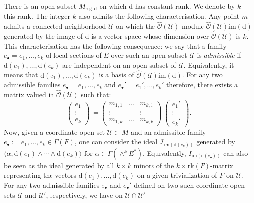 \documentclass[10pt]{article}
\theoremstyle{plain}
\theoremstyle{definition}
\theoremstyle{remark}
\newcommand{\dd}{\mathrm{d}}
\begin{document}
There is an open subset $ M_{\mathrm{reg},\dd}$ on which $\dd$ has constant rank. We denote by $ k$ this rank.  
The integer $k$ also admits the following characterisation. 
Any point $m$ admits a connected neighborhood $\mathcal U $ on which the $ \hat{\mathcal O}(\mathcal U)$-module $ \hat{\mathcal O}(\mathcal U) {\mathrm{im}}(\dd) $ generated by the image of $ \dd$ is a vector space whose dimension over $ \hat{\mathcal O}(\mathcal U)$ is $ k$.  
This characterisation has the following consequence: we say that a family $ e_\bullet = e_1, \dots, e_k$ of local sections of $E$ over such an open subset $ \mathcal U$ is \emph{admissible} if $\dd(e_1), \dots, \dd(e_k)$ are independent on an open subset of $\mathcal U $.  Equivalently, it means that  $\dd(e_1), \dots, \dd(e_k)$ is a basis of $ \hat{\mathcal O}(\mathcal U) {\mathrm{im}}(\dd) $. For any two admissible families
$ e_\bullet = e_1, \dots, e_k$  and $ e_\bullet' = e_1', \dots, e_k'$ therefore, there exists a matrix valued in $ \hat{\mathcal O}(\mathcal U)$ such that:
 \begin{equation} \label{eq:matrix}  \begin{pmatrix}
     e_ 1 \\ \vdots \\ e_k
 \end{pmatrix}  \, = \begin{pmatrix}
     m_{1,1} &\ldots &  m_{k,1}\\ \vdots &&\vdots\\ m_{1,k} &\ldots & m_{k,k}
 \end{pmatrix}  \, \begin{pmatrix}
     e_1' \\ \vdots \\ e_k'
 \end{pmatrix}  .\end{equation}
Now, given a coordinate open set $ \mathcal U \subset M$ and an admissible family $e_{\bullet} := e_1, \dots, e_k \in \Gamma(F)$, one can consider the ideal $ \mathcal I_{{\mathrm{im}}(\dd(e_\bullet))}$ generated by  $ \langle \alpha , \dd(e_1)\wedge \cdots \wedge \dd(e_k)\rangle $ for $ \alpha \in \Gamma(\wedge^k E^*) $. 
  Equivalently, $I_{{\mathrm{im}}(\dd(e_\bullet))}$ can also be seen as the ideal generated by all $ k \times k$ minors of the $ k \times {\mathrm{rk}}(F)$-matrix representing the vectors $\dd(e_1), \dots ,\dd(e_k)  $ on a given   trivialization of $F$ on $ \mathcal U$.
For any two admissible families $ e_\bullet$ and $ e_\bullet '$ defined on two such  coordinate open sets $ \mathcal U$  and $ \mathcal U'$, respectively, we have on $ \mathcal U \cap \mathcal U'$
\end{document}
